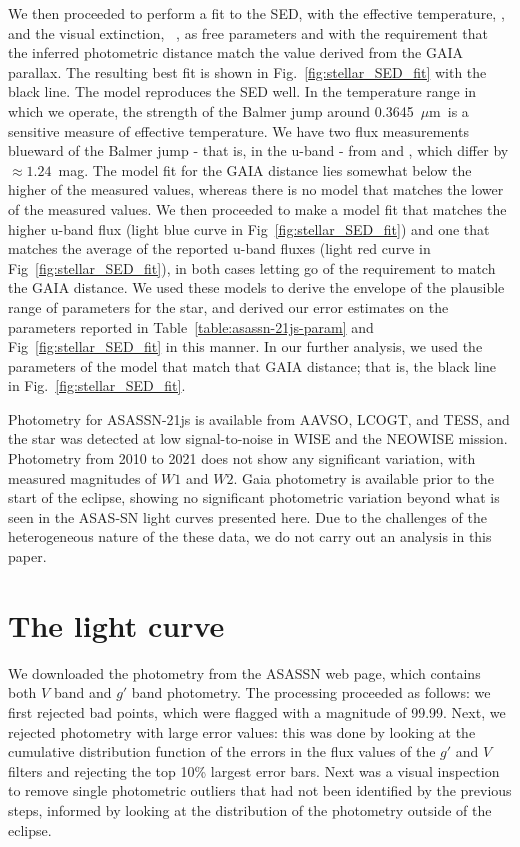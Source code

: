 \documentclass[letter]{aa} %
\newcommand{\mum}{$\mu$m}
\begin{document}
We then proceeded to perform a fit to the SED, with the effective temperature, \Teff, and the visual extinction, \Av \ , as free parameters and with the requirement that the inferred photometric distance match the value derived from the GAIA parallax.
%
The resulting best fit is shown in Fig.~\ref{fig:stellar_SED_fit} with the black line.
%
The model reproduces the SED well. In the temperature range in which we operate, the strength of the Balmer jump around 0.3645~\mum \ is a sensitive measure of effective temperature.
%
We have two flux measurements blueward of the Balmer jump - that is, in the u-band - from \cite{2014MNRAS.440.2036D} and \cite{2024arXiv240202015O}, which differ by $\approx1.24$~mag.
%
The model fit for the GAIA distance lies somewhat below the higher of the measured values, whereas there is no model that matches the lower of the measured values.
%
We then proceeded to make a model fit that matches the higher u-band flux (light blue curve in Fig~\ref{fig:stellar_SED_fit}) and one that matches the average of the reported u-band fluxes (light red curve in Fig~\ref{fig:stellar_SED_fit}), in both cases letting go of the requirement to match the GAIA distance.
%
We used these models to derive the envelope of the plausible range of parameters for the star, and derived our error estimates on the parameters reported in Table~\ref{table:asassn-21js-param} and Fig~\ref{fig:stellar_SED_fit} in this manner.
%
In our further analysis, we used the parameters of the model that match that GAIA distance; that is, the black line in Fig.~\ref{fig:stellar_SED_fit}.

Photometry for ASASSN-21js is available from AAVSO, LCOGT, and TESS, and the star was detected at low signal-to-noise in WISE and the NEOWISE mission. 
%
Photometry from 2010 to 2021 does not show any significant variation, with measured magnitudes of $W1$ and $W2$.
%
Gaia photometry is available prior to the start of the eclipse, showing no significant photometric variation beyond what is seen in the ASAS-SN light curves presented here.
%
Due to the challenges of the heterogeneous nature of the these data, we do not carry out an analysis in this paper.

\section{The light curve}\label{sec:lightcurve}

We downloaded the photometry from the ASASSN web page, which contains both $V$ band and $g'$ band photometry.
%
The processing proceeded as follows: we first rejected bad points, which were flagged with a magnitude of 99.99.
%
Next, we rejected photometry with large error values: this was done by looking at the cumulative distribution function of the errors in the flux values of the $g'$ and $V$ filters and rejecting the top 10\% largest error bars.
%
Next was a visual inspection to remove single photometric outliers that had not been identified by the previous steps, informed by looking at the distribution of the photometry outside of the eclipse.
\end{document}
